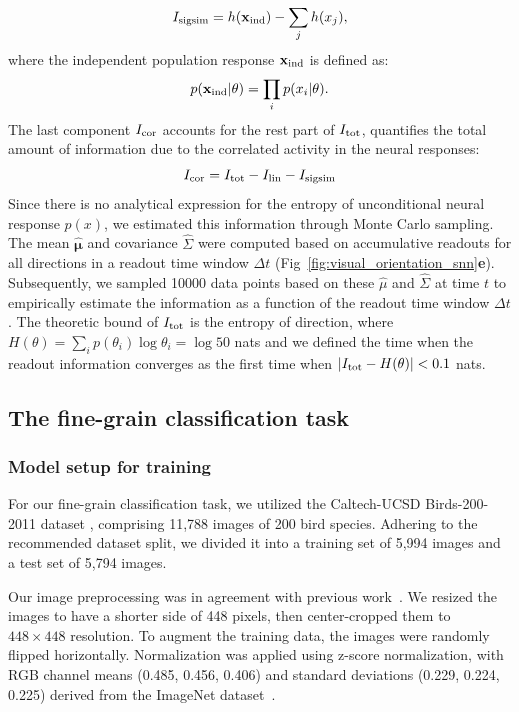 \begin{equation}
    I_{\rm sigsim} = h(\mathbf{x}_{\rm ind}) - \sum_j h(x_j),
\end{equation}
where the independent population response \(\mathbf{x}_{\rm ind}\) is defined as:
\begin{equation}
    p(\mathbf{x}_{\rm ind} | \theta) = \prod_i p(x_i | \theta).
\end{equation}
The last component \(I_{\rm cor}\) accounts for the rest part of \(I_{\rm tot}\), quantifies the total amount of information due to the correlated activity in the neural responses:
\begin{equation}
    I_{\rm cor} = I_{\rm tot} - I_{\rm lin} - I_{\rm sigsim}
\end{equation} 
Since there is no analytical expression for the entropy of unconditional neural response \(p(x)\), we estimated this information through Monte Carlo sampling.
The mean \(\hat{\mathbf{\mu}}\) and covariance \(\hat{\Sigma}\) were computed based on accumulative readouts for all directions in a readout time window \(\Delta t\) (Fig~\ref{fig:visual_orientation_snn}\textbf{e}). 
Subsequently, we sampled 10000 data points based on these \(\hat{\mu}\) and \(\hat{\Sigma}\) at time \(t\) to empirically estimate the information as a function of the readout time window \(\Delta t\).
The theoretic bound of \(I_{\rm tot}\) is the entropy of direction, where \(H(\theta) = \sum_i p(\theta_i)\log \theta_i = \log 50\) nats and we defined the time when the readout information converges as the first time when \(|I_{\rm tot} - H(\theta)| < 0.1\) nats.

\subsection{The fine-grain classification task}
\subsubsection{Model setup for training}
For our fine-grain classification task, we utilized the Caltech-UCSD Birds-200-2011 dataset \cite{WahCUB_200_2011}, comprising 11,788 images of 200 bird species. 
Adhering to the recommended dataset split, we divided it into a training set of 5,994 images and a test set of 5,794 images.

Our image preprocessing was in agreement with previous work~\cite{Wang2020}. 
We resized the images to have a shorter side of 448 pixels, then center-cropped them to \(448 \times 448\) resolution. 
To augment the training data, the images were randomly flipped horizontally. Normalization was applied using z-score normalization, with RGB channel means (0.485, 0.456, 0.406) and standard deviations (0.229, 0.224, 0.225) derived from the ImageNet dataset~\cite{simonyan2014very}.

